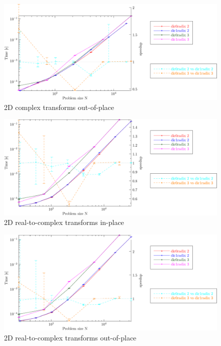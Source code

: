\documentclass[12pt]{article}
\begin{document}
\centering
\begin{figure}[htbp]
   \includegraphics[width=\textwidth]{2d_c2coutofplace_double.pdf}
   \caption{2D complex transforms out-of-place}
\end{figure}

\centering
\begin{figure}[htbp]
   \includegraphics[width=\textwidth]{2d_r2cinplace_double.pdf}
   \caption{2D real-to-complex transforms in-place}
\end{figure}
\clearpage

\centering
\begin{figure}[htbp]
   \includegraphics[width=\textwidth]{2d_r2coutofplace_double.pdf}
   \caption{2D real-to-complex transforms out-of-place}
\end{figure}
\end{document}
